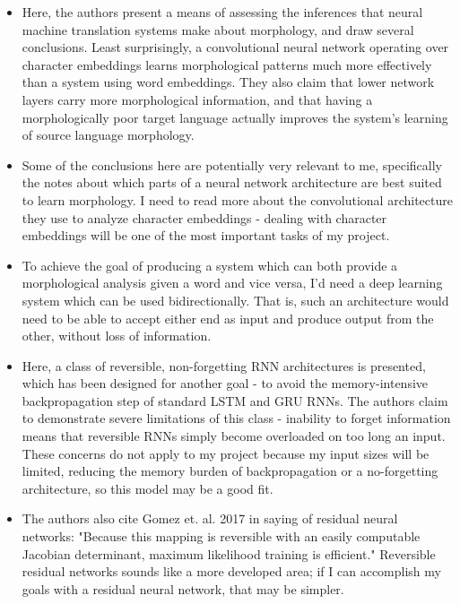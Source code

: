 \documentclass[12pt]{report}
\begin{document}

\begin{itemize}
	
	\item Here, the authors present a means of assessing the inferences that neural machine translation systems make about morphology, and draw several conclusions. Least surprisingly, a convolutional neural network operating over character embeddings learns morphological patterns much more effectively than a system using word embeddings. They also claim that lower network layers carry more morphological information, and that having a morphologically poor target language actually improves the system's learning of source language morphology.
	
	\item Some of the conclusions here are potentially very relevant to me, specifically the notes about which parts of a neural network architecture are best suited to learn morphology. I need to read more about the convolutional architecture they use to analyze character embeddings - dealing with character embeddings will be one of the most important tasks of my project.
	
\end{itemize}


\begin{itemize}
	
	\item To achieve the goal of producing a system which can both provide a morphological analysis given a word and vice versa, I'd need a deep learning system which can be used bidirectionally. That is, such an architecture would need to be able to accept either end as input and produce output from the other, without loss of information. 
	
	\item Here, a class of reversible, non-forgetting RNN architectures is presented, which has been designed for another goal - to avoid the memory-intensive backpropagation step of standard LSTM and GRU RNNs. The authors claim to demonstrate severe limitations of this class - inability to forget information means that reversible RNNs simply become overloaded on too long an input. These concerns do not apply to my project because my input sizes will be limited, reducing the memory burden of backpropagation or a no-forgetting architecture, so this model may be a good fit.
	
	\item The authors also cite Gomez et. al. 2017\cite{Gomez2017} in saying of residual neural networks: "Because this mapping is reversible with an easily computable Jacobian determinant, maximum likelihood training is efficient." Reversible residual networks sounds like a more developed area; if I can accomplish my goals with a residual neural network, that may be simpler.
	
\end{itemize}
\end{document}
